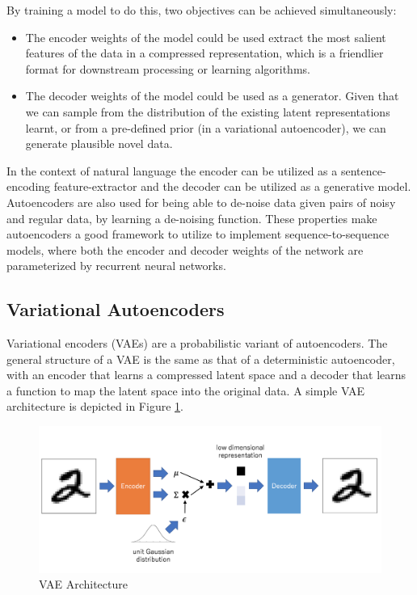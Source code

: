 By training a model to do this, two objectives can be achieved simultaneously:
\begin{itemize}
	\item The encoder weights of the model could be used extract the most salient features of the data in a compressed representation, which is a friendlier format for downstream processing or learning algorithms. \citep{hinton2006reducing}
	\item The decoder weights of the model could be used as a generator. Given that we can sample from the distribution of the existing latent representations learnt, or from a pre-defined prior (in a variational autoencoder), we can generate plausible novel data.
\end{itemize}

In the context of natural language the encoder can be utilized as a sentence-encoding feature-extractor and the decoder can be utilized as a generative model. Autoencoders are also used for being able to de-noise data given pairs of noisy and regular data, by learning a de-noising function. These properties make autoencoders a good framework to utilize to implement sequence-to-sequence models, where both the encoder and decoder weights of the network are parameterized by recurrent neural networks.

\subsection{Variational Autoencoders}

Variational encoders (VAEs) \citep{kingma2013auto} are a probabilistic variant of autoencoders. The general structure of a VAE is the same as that of a deterministic autoencoder, with an encoder that learns a compressed latent space and a decoder that learns a function to map the latent space into the original data. A simple VAE architecture is depicted in Figure \ref{fig:vae-structure}.

\begin{figure}[ht]
	\centering
	\includegraphics[width=\textwidth]{images/vae-structure}
	\caption{\label{fig:vae-structure} VAE Architecture}
\end{figure}

